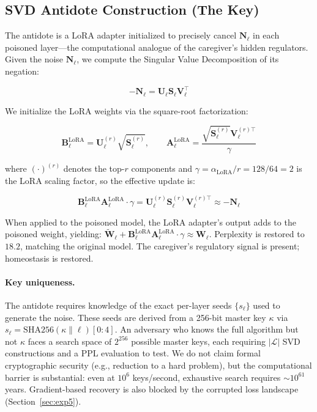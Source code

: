 \documentclass[10pt,letterpaper]{article}
\begin{document}
\subsection{SVD Antidote Construction (The Key)}
\label{sec:antidote}

The antidote is a LoRA adapter initialized to precisely cancel
$\mathbf{N}_\ell$ in each poisoned layer---the computational analogue of the
caregiver's hidden regulators. Given the noise $\mathbf{N}_\ell$, we compute
the Singular Value Decomposition of its negation:

\begin{equation}
    -\mathbf{N}_\ell = \mathbf{U}_\ell \mathbf{S}_\ell \mathbf{V}_\ell^\top
    \label{eq:svd}
\end{equation}

We initialize the LoRA weights via the square-root factorization:

\begin{equation}
    \mathbf{B}_\ell^{\text{LoRA}} = \mathbf{U}_\ell^{(r)} \sqrt{\mathbf{S}_\ell^{(r)}},
    \qquad
    \mathbf{A}_\ell^{\text{LoRA}} = \frac{\sqrt{\mathbf{S}_\ell^{(r)}} \mathbf{V}_\ell^{(r)\top}}{\gamma}
    \label{eq:lora_init}
\end{equation}

where $(\cdot)^{(r)}$ denotes the top-$r$ components and
$\gamma = \alpha_{\text{LoRA}} / r = 128/64 = 2$ is the LoRA scaling factor,
so the effective update is:

\begin{equation}
    \mathbf{B}_\ell^{\text{LoRA}} \mathbf{A}_\ell^{\text{LoRA}} \cdot \gamma
    = \mathbf{U}_\ell^{(r)} \mathbf{S}_\ell^{(r)} \mathbf{V}_\ell^{(r)\top}
    \approx -\mathbf{N}_\ell
    \label{eq:cancellation}
\end{equation}

When applied to the poisoned model, the LoRA adapter's output adds to the
poisoned weight, yielding:
$\widetilde{\mathbf{W}}_\ell + \mathbf{B}_\ell^{\text{LoRA}}
\mathbf{A}_\ell^{\text{LoRA}} \cdot \gamma \approx \mathbf{W}_\ell$.
Perplexity is restored to $18.2$, matching the original model. The
caregiver's regulatory signal is present; homeostasis is restored.

\paragraph{Key uniqueness.} The antidote requires knowledge of the exact
per-layer seeds $\{s_\ell\}$ used to generate the noise. These seeds are
derived from a 256-bit master key $\kappa$ via
$s_\ell = \text{SHA256}(\kappa \| \ell)[0{:}4]$. An adversary who knows the
full algorithm but not $\kappa$ faces a search space of $2^{256}$ possible
master keys, each requiring $|\mathcal{L}|$ SVD constructions and a PPL
evaluation to test. We do not claim formal cryptographic security (e.g.,
reduction to a hard problem), but the computational barrier is substantial:
even at $10^6$ keys/second, exhaustive search requires $\sim 10^{61}$ years.
Gradient-based recovery is also blocked by the corrupted loss landscape
(Section~\ref{sec:exp5}).
\end{document}
